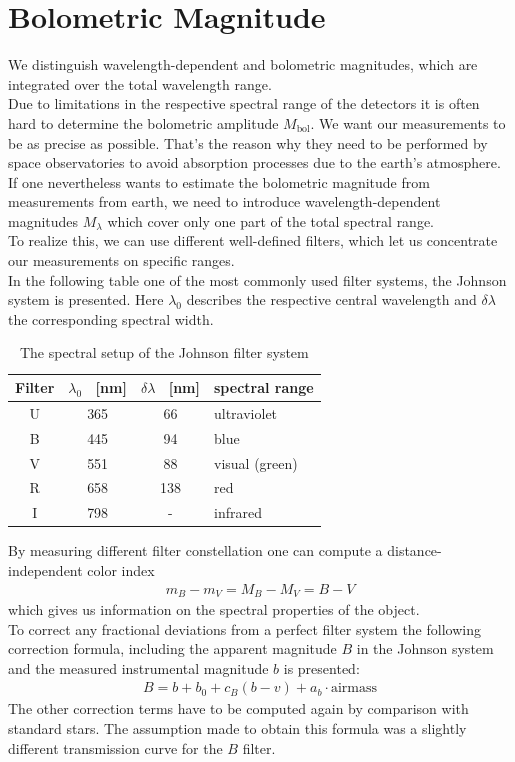 \section{Bolometric Magnitude}
We distinguish wavelength-dependent and bolometric magnitudes, which are integrated over the total wavelength range. \\ 
Due to limitations in the respective spectral range of the detectors it is often hard to determine the bolometric amplitude $M_{\text{bol}}$. We want our measurements to be as precise as possible. That's the reason why they need to be performed by space observatories to avoid absorption processes due to the earth's atmosphere. \\
If one nevertheless wants to estimate the bolometric magnitude from measurements from earth, we need to introduce wavelength-dependent magnitudes $M_{\lambda}$ which cover only one part of the total spectral range. \\
 To realize this, we can use different well-defined filters, which let us concentrate our measurements on specific ranges. \\
In the following table one of the most commonly used filter systems, the Johnson system is presented. Here $\lambda_0$ describes the respective central wavelength and $\delta\lambda$ the corresponding spectral width.
\begin{table}[H]
\centering
\setlength{\tabcolsep}{5mm}
\setlength\extrarowheight{2mm}
\begin{tabular}{c| c c l }

Filter & $\lambda_0$ \ [nm] & $\delta\lambda$ \ [nm] & spectral range \\ \hline 
U & 365 & 66 & ultraviolet  \\
B & 445 & 94 & blue\\
V & 551 & 88 & visual (green) \\
R & 658 & 138 & red \\
I & 798 & - & infrared \\

\end{tabular}
\caption{\label{tab:johnson} The spectral setup of the Johnson filter system \cite{Pott2017}}
\end{table}

By measuring different filter constellation one can compute a distance-independent color index
\begin{align}
	m_B - m_V = M_B - M_V = B-V
\end{align}
which gives us information on the spectral properties of the object. \\
To correct any fractional deviations from a perfect filter system the following correction formula, including the apparent magnitude $B$ in the Johnson system and the measured instrumental magnitude $b$ is presented: 
\begin{align}
	B = b + b_0 + c_B(b-v) + a_b \cdot \text{airmass}
\end{align}
The other correction terms have to be computed again by comparison with standard stars. The assumption made to obtain this formula was a slightly different transmission curve for the $B$ filter.
